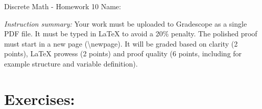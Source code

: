 \documentclass[12pt]{article}
\begin{document}
\begin{center}
    {\LARGE Discrete Math - Homework 10}  \Large \newline
    Name:
\end{center}

\emph{Instruction summary:} Your work must be uploaded to Gradescope as a single PDF file. It must be typed in LaTeX to avoid a 20\% penalty. The polished proof must start in a new page (\textbackslash newpage). It will be graded based on clarity (2 points), LaTeX prowess (2 points) and proof quality (6 points, including for example structure and variable definition).

\section*{Exercises:}
\end{document}

